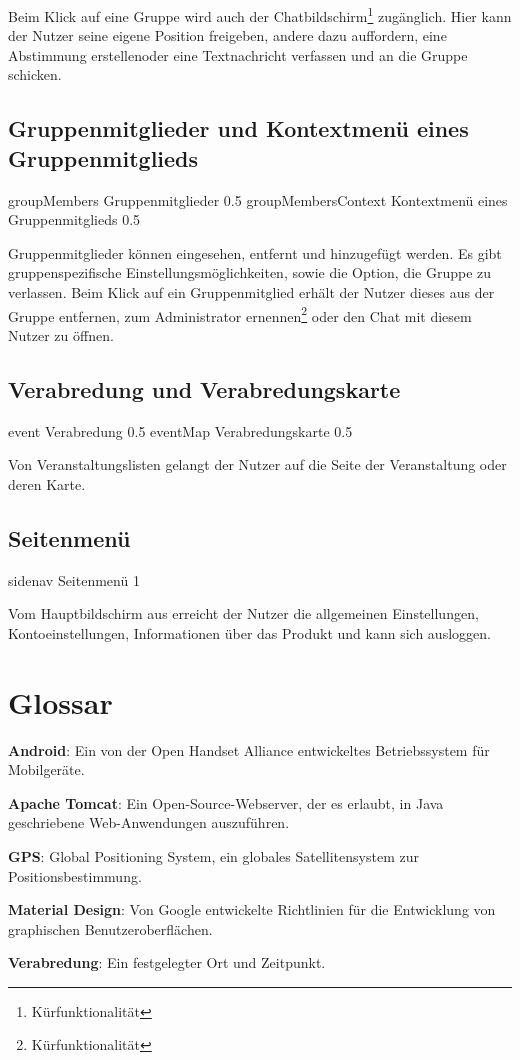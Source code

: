 \documentclass[parskip=full,11pt]{scrartcl}
\begin{document}
Beim Klick auf eine Gruppe wird auch der
Chatbildschirm\footnote[1]{Kürfunktionalität} zugänglich.
Hier kann der Nutzer seine eigene Position freigeben, andere dazu auffordern,
eine Abstimmung erstellen\footnotemark[1] oder eine Textnachricht verfassen
und an die Gruppe schicken\footnotemark[1].

\pagebreak
\subsection{Gruppenmitglieder und Kontextmenü eines Gruppenmitglieds}
{groupMembers}
{Gruppenmitglieder}
{0.5}
{groupMembersContext}
{Kontextmenü eines Gruppenmitglieds}
{0.5}

Gruppenmitglieder können eingesehen, entfernt und hinzugefügt werden.
Es gibt gruppenspezifische Einstellungsmöglichkeiten, sowie die Option,
die Gruppe zu verlassen.
Beim Klick auf ein Gruppenmitglied erhält der Nutzer dieses aus der
Gruppe entfernen, zum Administrator ernennen\footnote[1]{Kürfunktionalität}
oder den Chat mit diesem Nutzer zu öffnen\footnotemark[1].

\pagebreak
\subsection{Verabredung  und Verabredungskarte}
{event}
{Verabredung}
{0.5}
{eventMap}
{Verabredungskarte}
{0.5}

Von Veranstaltungslisten gelangt der Nutzer auf die Seite der Veranstaltung oder deren Karte.

\pagebreak
\subsection{Seitenmenü}
{sidenav}
{Seitenmenü}
{1}

Vom Hauptbildschirm aus erreicht der Nutzer die allgemeinen Einstellungen, Kontoeinstellungen, Informationen über das Produkt und kann sich ausloggen.

\pagebreak
\section{Glossar}

\textbf{Android}:
Ein von der Open Handset Alliance entwickeltes Betriebssystem für Mobilgeräte.

\textbf{Apache Tomcat}:
Ein Open-Source-Webserver, der es erlaubt, in Java geschriebene Web-Anwendungen
auszuführen.

\textbf{GPS}:
Global Positioning System, ein globales Satellitensystem zur
Positionsbestimmung.

\textbf{Material Design}:
Von Google entwickelte Richtlinien für die Entwicklung von graphischen
Benutzeroberflächen.

\textbf{Verabredung}:
Ein festgelegter Ort und Zeitpunkt.
\end{document}

